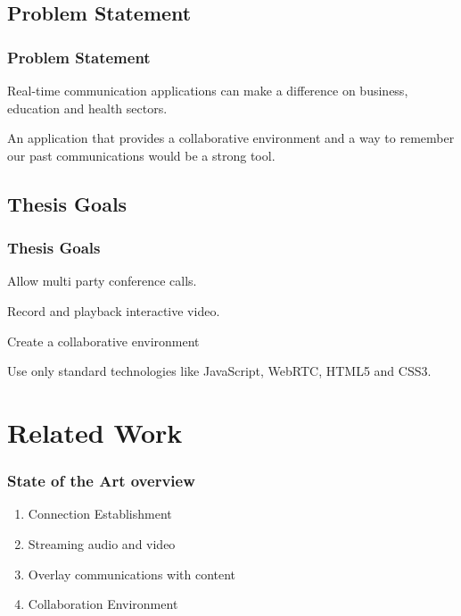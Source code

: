 \documentclass[compress]{beamer}
\begin{document}
	\subsection{Problem Statement} %
  		\begin{frame}[c]
		\frametitle{Problem Statement}
		Real-time communication applications can make a difference on business, education and health sectors.

		\vfill

		An application that provides a collaborative environment and a way to remember our past communications would be a strong tool.
		
		\end{frame}






		
	

	\subsection{Thesis Goals} %
  		\begin{frame}[c]
		\frametitle{Thesis Goals}
		Allow multi party conference calls.

		\vfill
		
		Record and playback interactive video.
		
		\vfill

        Create a collaborative environment        

        \vfill

		Use only standard technologies like JavaScript, WebRTC, HTML5 and CSS3.


		\end{frame}


\section{Related Work}\label{related}

	\begin{frame}[c]
			\frametitle{State of the Art overview}
	\begin{enumerate}
		\item Connection Establishment
		\item Streaming audio and video
		\item Overlay communications with content
		\item Collaboration Environment
	\end{enumerate}


	\end{frame}
\end{document}
